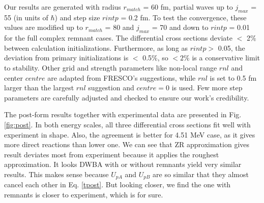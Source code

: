 Our results are generated with radius $r_{match}$ = 60 fm, partial waves up to $j_{max}$ = 55 (in units of $\hbar$) and step size $rintp$ = 0.2 fm. 
To test the convergence, these values are modified up to $r_{match}$ = 80 and $j_{max}$ = 70 and down to $rintp$ = 0.01 for the full complex remnant cases.
 The differential cross sections deviate $<$ 2$\%$  between calculation initializations. 
 Furthermore, as long as $rintp >$ 0.05, the deviation from primary initializations is $<$ 0.5$\%$, so $< 2\%$ is a conservative limit to stability. 
 Other grid and strength parameters like non-local range $rnl$ and center $centre$ are adapted from FRESCO's suggestions,
while $rnl$ is set to 0.5 fm larger than the largest $rnl$ suggestion and $centre=0$ is used.
Few more step parameters are carefully adjusted and checked to ensure our work's credibility.

The post-form results together with experimental data \cite{PhysRev.101.209} are presented in Fig. \ref{fig:post}.
In both energy scales, all three differential cross sections fit well with experiment in shape. 
Also, the agreement is better for 4.51 MeV case, as it gives more direct reactions than lower one.
We can see that ZR approximation gives result deviates most from experiment because it applies the roughest approximation.
It looks DWBA with or without remnants yield very similar results.
This makes sense because $U_{pA}$ and $U_{pB}$ are so similar that they almost cancel each other in Eq. \ref{tpost}.
But looking closer, we find the one with remnants is closer to experiment, which is for sure.